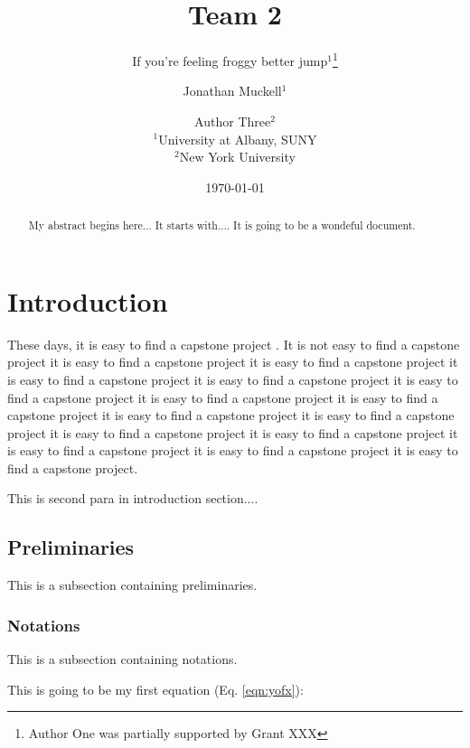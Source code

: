 \documentclass[11pt]{article}
\date{
\today
}
\theoremstyle{plain}
\theoremstyle{definition}
\begin{document}
\title{Team 2}
\author{If you're feeling froggy better jump$^1$\thanks{Author One was partially supported by Grant XXX} \and Jonathan Muckell$^1$ \and Author Three$^2$\\
$^1$University at Albany, SUNY\\
$^2$New York University}
	\maketitle
	
\begin{abstract}
My abstract begins here... It starts with.... It is going to be a wondeful document.
		
\end{abstract}


\section{Introduction}
\label{sec:intro}
These days, it is easy to find a capstone project \cite{Atrey2021BrickHouseSecuity}. It is not 
easy to find a capstone project it is easy to find a capstone project it is easy to find a capstone project it is easy to find a capstone project it is easy to find a capstone project it is easy to find a capstone project it is easy to find a capstone project it is easy to find a capstone project it is easy to find a capstone project it is easy to find a capstone project it is easy to find a capstone project it is easy to find a capstone project it is easy to find a capstone project it is easy to find a capstone project it is easy to find a capstone project.

This is second para in introduction section....

\subsection{Preliminaries}\label{sec:prelim}
This is a subsection containing preliminaries.

\subsubsection{Notations}\label{sec:notations}
This is a subsection containing notations.

This is going to be my first equation (Eq. \ref{eqn:yofx}):
	
\end{document}
